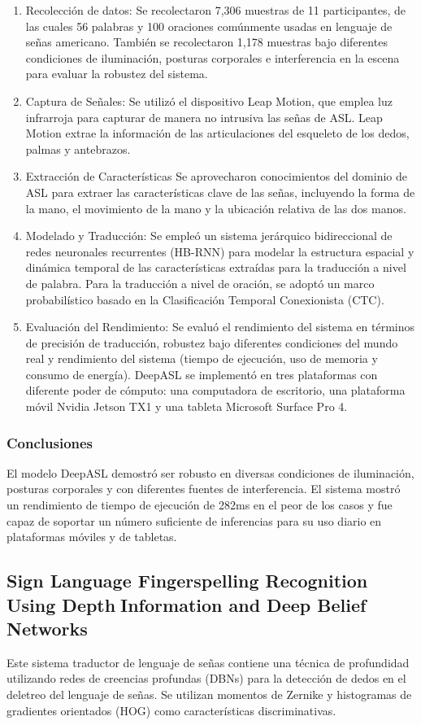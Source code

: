 \begin{enumerate}
	\item {Recolección de datos: }
	Se recolectaron 7,306 muestras de 11 participantes, de las cuales 56 palabras y 100 oraciones comúnmente usadas en lenguaje de señas americano. También se recolectaron 1,178 muestras bajo diferentes condiciones de iluminación, posturas corporales e interferencia en la escena para evaluar la robustez del sistema.
	\item {Captura de Señales: }
	Se utilizó el dispositivo Leap Motion, que emplea luz infrarroja para capturar de manera no intrusiva las señas de ASL. Leap Motion extrae la información de las articulaciones del esqueleto de los dedos, palmas y antebrazos.
	\item {Extracción de Características}
	Se aprovecharon conocimientos del dominio de ASL para extraer las características clave de las señas, incluyendo la forma de la mano, el movimiento de la mano y la ubicación relativa de las dos manos.
	\item {Modelado y Traducción: }
	Se empleó un sistema jerárquico bidireccional de redes neuronales recurrentes (HB-RNN) para modelar la estructura espacial y dinámica temporal de las características extraídas para la traducción a nivel de palabra. Para la traducción a nivel de oración, se adoptó un marco probabilístico basado en la Clasificación Temporal Conexionista (CTC).
	\item {Evaluación del Rendimiento: }
	Se evaluó el rendimiento del sistema en términos de precisión de traducción, robustez bajo diferentes condiciones del mundo real y rendimiento del sistema (tiempo de ejecución, uso de memoria y consumo de energía). DeepASL se implementó en tres plataformas con diferente poder de cómputo: una computadora de escritorio, una plataforma móvil Nvidia Jetson TX1 y una tableta Microsoft Surface Pro 4.
\end{enumerate}
\subsubsection {Conclusiones}
El modelo DeepASL demostró ser robusto en diversas condiciones de iluminación, posturas corporales y con diferentes fuentes de interferencia.
El sistema mostró un rendimiento de tiempo de ejecución de 282ms en el peor de los casos y fue capaz de soportar un número suficiente de inferencias para su uso diario en plataformas móviles y de tabletas.


\subsection{Sign Language Fingerspelling Recognition Using DepthInformation and Deep Belief Networks}
Este sistema traductor de lenguaje de señas contiene una técnica de profundidad utilizando redes de creencias profundas (DBNs) para la detección de dedos en el deletreo del lenguaje de señas. Se utilizan momentos de Zernike y histogramas de gradientes orientados (HOG) como características discriminativas.

